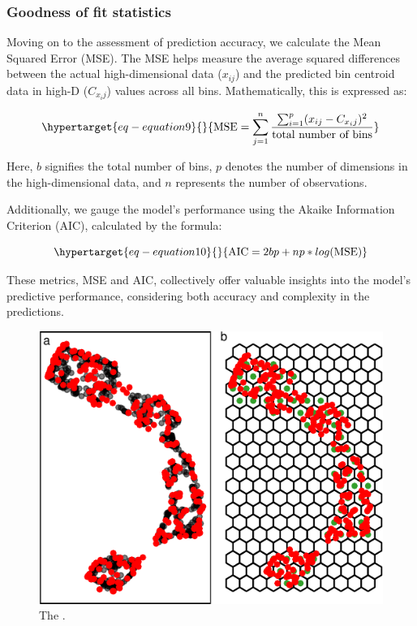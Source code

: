 \documentclass[
  12pt]{article}
\begin{document}
\hypertarget{goodness-of-fit-statistics}{%
\subsubsection{Goodness of fit
statistics}\label{goodness-of-fit-statistics}}

Moving on to the assessment of prediction accuracy, we calculate the
Mean Squared Error (MSE). The MSE helps measure the average squared
differences between the actual high-dimensional data (\(x_{ij}\)) and
the predicted bin centroid data in high-D (\(C_{x_ij}\)) values across
all bins. Mathematically, this is expressed as:

\begin{equation}\protect\hypertarget{eq-equation9}{}{
\text{MSE} = \sum_{j = 1}^{n} \frac{\sum_{i = 1}^{p} (x_{ij} - C_{x_ij})^2}{\text{total number of bins}}
}\label{eq-equation9}\end{equation}

Here, \(b\) signifies the total number of bins, \(p\) denotes the number
of dimensions in the high-dimensional data, and \(n\) represents the
number of observations.

Additionally, we gauge the model's performance using the Akaike
Information Criterion (AIC), calculated by the formula:

\begin{equation}\protect\hypertarget{eq-equation10}{}{
\text{AIC} = 2bp + np * log(\text{MSE})
}\label{eq-equation10}\end{equation}

These metrics, MSE and AIC, collectively offer valuable insights into
the model's predictive performance, considering both accuracy and
complexity in the predictions.

\begin{figure}

{\centering \includegraphics{paper_files/figure-pdf/fig-predict-1.pdf}

}

\caption{\label{fig-predict}The .}

\end{figure}
\end{document}
